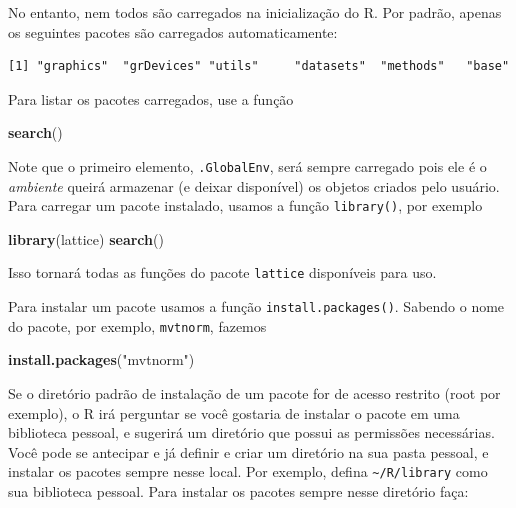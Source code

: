 \documentclass[10pt,a4paper]{book}
\newenvironment{Shaded}{\begin{snugshade}}{\end{snugshade}}
\newcommand{\KeywordTok}[1]{\textcolor[rgb]{0.13,0.29,0.53}{\textbf{#1}}}
\newcommand{\StringTok}[1]{\textcolor[rgb]{0.31,0.60,0.02}{#1}}
\newcommand{\NormalTok}[1]{#1}
\begin{document}
No entanto, nem todos são carregados na inicialização do R. Por padrão,
apenas os seguintes pacotes são carregados automaticamente:

\begin{verbatim}
[1] "graphics"  "grDevices" "utils"     "datasets"  "methods"   "base"     
\end{verbatim}

Para listar os pacotes carregados, use a função

\begin{Shaded}
\begin{Highlighting}[]
\KeywordTok{search}\NormalTok{()}
\end{Highlighting}
\end{Shaded}

Note que o primeiro elemento, \texttt{.GlobalEnv}, será sempre carregado
pois ele é o \emph{ambiente} queirá armazenar (e deixar disponível) os
objetos criados pelo usuário. Para carregar um pacote instalado, usamos
a função \texttt{library()}, por exemplo

\begin{Shaded}
\begin{Highlighting}[]
\KeywordTok{library}\NormalTok{(lattice)}
\KeywordTok{search}\NormalTok{()}
\end{Highlighting}
\end{Shaded}

Isso tornará todas as funções do pacote \texttt{lattice} disponíveis
para uso.

Para instalar um pacote usamos a função \texttt{install.packages()}.
Sabendo o nome do pacote, por exemplo, \texttt{mvtnorm}, fazemos

\begin{Shaded}
\begin{Highlighting}[]
\KeywordTok{install.packages}\NormalTok{(}\StringTok{"mvtnorm"}\NormalTok{)}
\end{Highlighting}
\end{Shaded}

Se o diretório padrão de instalação de um pacote for de acesso restrito
(root por exemplo), o R irá perguntar se você gostaria de instalar o
pacote em uma biblioteca pessoal, e sugerirá um diretório que possui as
permissões necessárias. Você pode se antecipar e já definir e criar um
diretório na sua pasta pessoal, e instalar os pacotes sempre nesse
local. Por exemplo, defina \texttt{\textasciitilde{}/R/library} como sua
biblioteca pessoal. Para instalar os pacotes sempre nesse diretório
faça:
\end{document}
